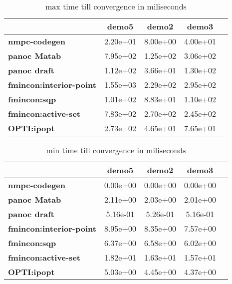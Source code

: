 \begin{table}[H]
	\centering
	\begin{tabular}{|l|c|c|c|c|}
		\hline
		&\textbf{demo5}&\textbf{demo2}&\textbf{demo3}\\\hline
		\textbf{nmpc-codegen}&2.20e+01&8.00e+00&4.00e+01\\\hline
		\textbf{panoc Matab}&7.95e+02&1.25e+02&3.06e+02\\\hline
		\textbf{panoc draft}&1.12e+02&3.66e+01&1.30e+02\\\hline
		\textbf{fmincon:interior-point}&1.55e+03&2.29e+02&2.95e+02\\\hline
		\textbf{fmincon:sqp}&1.01e+02&8.83e+01&1.10e+02\\\hline
		\textbf{fmincon:active-set}&7.83e+02&2.70e+02&2.45e+02\\\hline
		\textbf{OPTI:ipopt}&2.73e+02&4.65e+01&7.65e+01\\\hline
	\end{tabular}
	\caption{max time till convergence in miliseconds}
	\label{tbl:max time till convergence}
\end{table}

\begin{table}[H]
	\centering
	\begin{tabular}{|l|	c|c|c|c|}
		\hline
		&\textbf{demo5}&\textbf{demo2}&\textbf{demo3}\\\hline
		\textbf{nmpc-codegen}&0.00e+00&0.00e+00&0.00e+00\\\hline
		\textbf{panoc Matab}&2.11e+00&2.03e+00&2.01e+00\\\hline
		\textbf{panoc draft}&5.16e-01&5.26e-01&5.16e-01\\\hline
		\textbf{fmincon:interior-point}&8.95e+00&8.35e+00&7.57e+00\\\hline
		\textbf{fmincon:sqp}&6.37e+00&6.58e+00&6.02e+00\\\hline
		\textbf{fmincon:active-set}&1.82e+01&1.63e+01&1.57e+01\\\hline
		\textbf{OPTI:ipopt}&5.03e+00&4.45e+00&4.37e+00\\\hline
	\end{tabular}
	\caption{min time till convergence in miliseconds}
	\label{tbl:min time till convergence}
\end{table}


